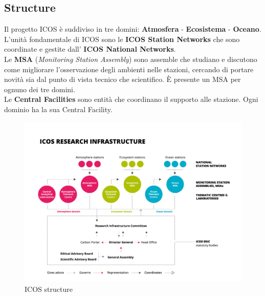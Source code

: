 \subsection{Structure}

Il progetto ICOS è suddiviso in tre domini: \textbf{Atmosfera} - \textbf{Ecosistema} - \textbf{Oceano}. \\

L'unità fondamentale di ICOS sono le \textbf{ICOS Station Networks} che sono coordinate e gestite dall'
\textbf{ICOS National Networks}. \\

Le \textbf{MSA} (\textit{Monitoring Station Assembly}) sono assemble che studiano e discutono come migliorare
l'osservazione degli ambienti nelle stazioni, cercando di portare novità sia dal punto di vista tecnico che scientifico.
È presente un MSA per ognuno dei tre domini. \\

Le \textbf{Central Facilities} sono entità che coordinano il supporto alle stazione. Ogni dominio ha la sua Central Facility. \\

\begin{figure}[h]
    \caption{ICOS structure}
    \centering
    \includegraphics[width=\textwidth]{figures/icos-structure.jpg}
\end{figure}